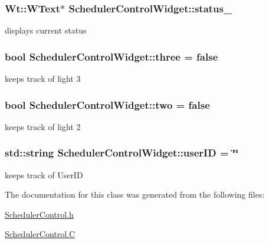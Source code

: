 \subsubsection[{\texorpdfstring{status\+\_\+}{status_}}]{\setlength{\rightskip}{0pt plus 5cm}Wt\+::\+W\+Text$\ast$ Scheduler\+Control\+Widget\+::status\+\_\+\hspace{0.3cm}{\ttfamily [private]}}\hypertarget{classSchedulerControlWidget_acdfb4ed24b3c2ea60fe91a48390e6235}{}\label{classSchedulerControlWidget_acdfb4ed24b3c2ea60fe91a48390e6235}
displays current status 
\subsubsection[{\texorpdfstring{three}{three}}]{\setlength{\rightskip}{0pt plus 5cm}bool Scheduler\+Control\+Widget\+::three = false\hspace{0.3cm}{\ttfamily [private]}}\hypertarget{classSchedulerControlWidget_ae7a161cbb41cbe616f44be386c0bf011}{}\label{classSchedulerControlWidget_ae7a161cbb41cbe616f44be386c0bf011}
keeps track of light 3 
\subsubsection[{\texorpdfstring{two}{two}}]{\setlength{\rightskip}{0pt plus 5cm}bool Scheduler\+Control\+Widget\+::two = false\hspace{0.3cm}{\ttfamily [private]}}\hypertarget{classSchedulerControlWidget_a77776c015d36da02cf252e0f08d9fe48}{}\label{classSchedulerControlWidget_a77776c015d36da02cf252e0f08d9fe48}
keeps track of light 2 
\subsubsection[{\texorpdfstring{user\+ID}{userID}}]{\setlength{\rightskip}{0pt plus 5cm}std\+::string Scheduler\+Control\+Widget\+::user\+ID = \char`\"{}\char`\"{}\hspace{0.3cm}{\ttfamily [private]}}\hypertarget{classSchedulerControlWidget_af73ee1b98fb7944ae193d5e880a59f31}{}\label{classSchedulerControlWidget_af73ee1b98fb7944ae193d5e880a59f31}
keeps track of User\+ID 

The documentation for this class was generated from the following files\+:\begin{DoxyCompactItemize}
\item 
\hyperlink{SchedulerControl_8h}{Scheduler\+Control.\+h}\item 
\hyperlink{SchedulerControl_8C}{Scheduler\+Control.\+C}\end{DoxyCompactItemize}
